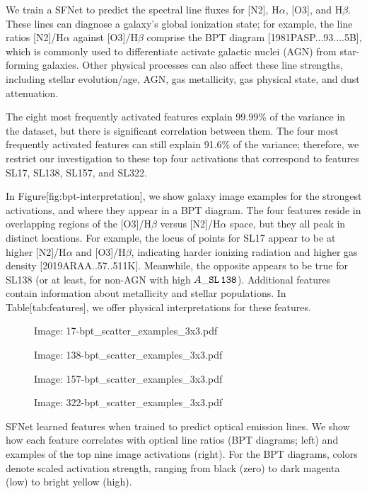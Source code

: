 \documentclass[11pt,a4paper]{article}
\begin{document}
We train a SFNet to predict the spectral line fluxes for [N2], H$\alpha$, [O3], and H$\beta$. These lines can diagnose a galaxy's global ionization state; for example, the line ratios [N2]/H$\alpha$ against [O3]/H$\beta$ comprise the BPT diagram [1981PASP...93....5B], which is commonly used to differentiate activate galactic nuclei (AGN) from star-forming galaxies. Other physical processes can also affect these line strengths, including stellar evolution/age, AGN, gas metallicity, gas physical state, and dust attenuation.

The eight most frequently activated features explain 99.99\% of the variance in the dataset, but there is significant correlation between them. The four most frequently activated features can still explain 91.6\% of the variance; therefore, we restrict our investigation to these top four activations that correspond to features SL17, SL138, SL157, and SL322.

In Figure[fig:bpt-interpretation], we show galaxy image examples for the strongest activations, and where they appear in a BPT diagram. The four features reside in overlapping regions of the [O3]/H$\beta$ versus [N2]/H$\alpha$ space, but they all peak in distinct locations. For example, the locus of points for SL17 appear to be at higher [N2]/H$\alpha$ and [O3]/H$\beta$, indicating harder ionizing radiation and higher gas density [2019ARAA..57..511K]. Meanwhile, the opposite appears to be true for SL138 (or at least, for non-AGN with high $A\_{\tt SL\,138}$). Additional features contain information about metallicity and stellar populations. In Table[tab:features], we offer physical interpretations for these features.

\begin{figure}[h]
\caption{Image: 17-bpt\_scatter\_examples\_3x3.pdf}
\end{figure}

\begin{figure}[h]
\caption{Image: 138-bpt\_scatter\_examples\_3x3.pdf}
\end{figure}

\begin{figure}[h]
\caption{Image: 157-bpt\_scatter\_examples\_3x3.pdf}
\end{figure}

\begin{figure}[h]
\caption{Image: 322-bpt\_scatter\_examples\_3x3.pdf}
\end{figure}

SFNet learned features when trained to predict optical emission lines. We show how each feature correlates with optical line ratios (BPT diagrams; left) and examples of the top nine image activations (right). For the BPT diagrams, colors denote scaled activation strength, ranging from black (zero) to dark magenta (low) to bright yellow (high).
\end{document}
